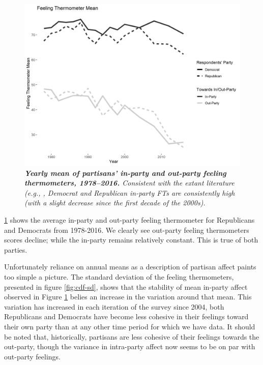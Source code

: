 \documentclass[12pt]{article}
\begin{document}
\begin{figure}[H]
\center\includegraphics[width=5in]{cdf-avg.png}
\caption{\label{fig:cdf-avg}\textit{\textbf{Yearly mean of partisans' in-party and out-party feeling thermometers, 1978--2016.} Consistent with the extant literature (e.g., \citet{iyengar2012affect}, Democrat and Republican in-party FTs are consistently high (with a slight decrease since the first decade of the 2000s).}}
\end{figure}
\noindent \ref{fig:cdf-avg} shows the average in-party and out-party feeling thermometer for Republicans and Democrats from 1978-2016. We clearly see out-party feeling thermometers scores decline; while the in-party remains relatively constant. This is true of both parties.

Unfortunately reliance on annual means as a description of partisan affect paints too simple a picture. The standard deviation of the feeling thermometers, presented in figure \ref{fig:cdf-sd}, shows that the stability of mean in-party affect observed in Figure \ref{fig:cdf-avg} belies an increase in the variation around that mean. This variation has increased in each iteration of the survey since 2004, both Republicans and Democrats have become less cohesive in their feelings toward their own party than at any other time period for which we have data. It should be noted that, historically, partisans are less cohesive of their feelings towards the out-party, though the variance in intra-party affect now seems to be on par with out-party feelings. %
\end{document}
